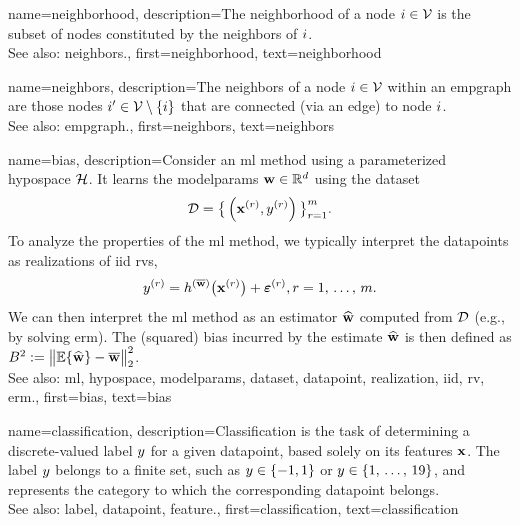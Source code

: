 {name={neighborhood},
	description={The neighborhood of a node $i \in \mathcal{V}$ is 
		the subset of nodes constituted by the \gls{neighbors} of $i$.
				\\ 
		See also: \gls{neighbors}.},
	first={neighborhood},
	text={neighborhood} 
}


{name={neighbors},
	description={The neighbors of a node $i \in \mathcal{V}$ 
		within an \gls{empgraph} are those nodes $i' \in \mathcal{V} \setminus \{ i\}$ that are connected (via an edge) to node $i$.
				\\ 
		See also: \gls{empgraph}.},
	first={neighbors},
	text={neighbors} 
}

{name={bias},
	description={Consider an \gls{ml} method using a parameterized \gls{hypospace} $\mathcal{H}$. 
		It learns the \gls{modelparams} ${\bf w} \in \mathbb{R}^{d}$ using the \gls{dataset} $$\mathcal{D}=\big\{ \left( {\bf x}^{(r)},y^{(r)} \right) \big\}_{r=1}^{m}.$$ 
		To analyze the properties of the \gls{ml} method, we typically interpret the \glspl{datapoint} as \glspl{realization} 
		of \gls{iid} \glspl{rv}, $$y^{(r)} = h^{(\overline{{\bf w}})}\big( {\bf x}^{(r)} \big) + \bm{\varepsilon}^{(r)}, r=1, \,\ldots, \,m.$$ 
		We can then interpret the \gls{ml} method as an estimator $\widehat{{\bf w}}$ 
		computed from $\mathcal{D}$ (e.g., by solving \gls{erm}). The (squared) bias incurred by the estimate $\widehat{{\bf w}}$ 
		is then defined as $B^{2} := \big\| \mathbb{E} \{ \widehat{{\bf w}}  \}- \overline{{\bf w}}\big\|_{2}^{2}$.
					\\ 
		See also: \gls{ml}, \gls{hypospace}, \gls{modelparams}, \gls{dataset}, \gls{datapoint}, \gls{realization}, \gls{iid}, \gls{rv}, \gls{erm}.},
	first={bias},
	text={bias} 
}

{name={classification},
	description={Classification is the task of determining a 
 		discrete-valued \gls{label} $y$ for a given \gls{datapoint}, based solely on its 
 		\glspl{feature} ${\bf x}$. The \gls{label} $y$ belongs to a finite set, such as 
 		$y \in \{-1,1\}$ or $y \in \{1, \,\ldots, \,19\}$, and represents the 
 		category to which the corresponding \gls{datapoint} belongs.
				\\ 
		See also: \gls{label}, \gls{datapoint}, \gls{feature}.},
	first={classification},
	text={classification} 
}


